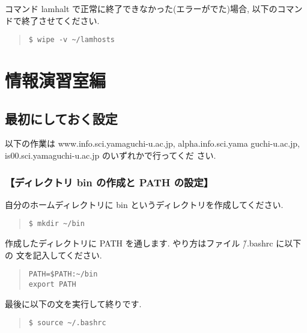 \documentclass[a4paper,titlepage]{jreport}
\begin{document}
コマンド lamhalt で正常に終了できなかった(エラーがでた)場合,
以下のコマンドで終了させてください.

\begin{quote}
\begin{screen}
\begin{verbatim}
$ wipe -v ~/lamhosts
\end{verbatim}
\end{screen}
\end{quote}

\newpage

\section{情報演習室編}

\subsection{最初にしておく設定}

以下の作業は www.info.sci.yamaguchi-u.ac.jp, alpha.info.sci.yama
guchi-u.ac.jp, is00.sci.yamaguchi-u.ac.jp のいずれかで行ってくだ
さい.

\subsubsection{【ディレクトリ bin の作成と PATH の設定】}
自分のホームディレクトリに bin というディレクトリを作成してください.

\begin{quote}
\begin{screen}
\begin{verbatim}
$ mkdir ~/bin
\end{verbatim}
\end{screen}
\end{quote}

作成したディレクトリに PATH を通します. やり方はファイル \~/.bashrc に以下の
文を記入してください.

\begin{quote}
\begin{screen}
\begin{verbatim}
PATH=$PATH:~/bin
export PATH
\end{verbatim}
\end{screen}
\end{quote}

最後に以下の文を実行して終りです.

\begin{quote}
\begin{screen}
\begin{verbatim}
$ source ~/.bashrc
\end{verbatim}
\end{screen}
\end{quote}
\end{document}
